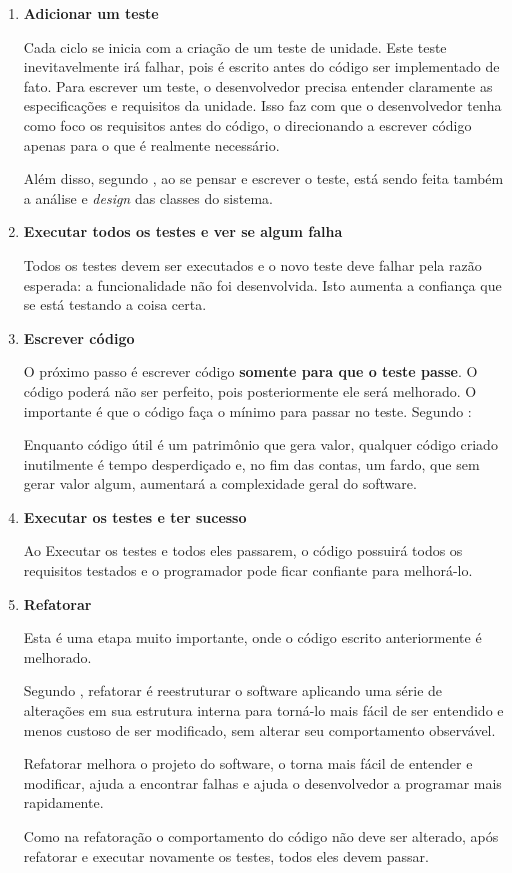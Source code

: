 \begin{enumerate}
\item \textbf{Adicionar um teste}

Cada ciclo se inicia com a criação de um teste de unidade. Este teste inevitavelmente irá falhar, pois é escrito antes do código ser implementado de fato. Para escrever um teste, o desenvolvedor precisa entender claramente as especificações e requisitos da unidade. Isso faz com que o desenvolvedor tenha como foco os requisitos antes do código, o direcionando a escrever código apenas para o que é realmente necessário.

Além disso, segundo , ao se pensar e escrever o teste, está sendo feita também a análise e \textit{design} das classes do sistema.

\item \textbf{Executar todos os testes e ver se algum falha}

Todos os testes devem ser executados e o novo teste deve falhar pela razão esperada: a funcionalidade não foi desenvolvida. Isto aumenta a confiança que se está testando a coisa certa.

\item \textbf{Escrever código}

O próximo passo é escrever código \textbf{somente para que o teste passe}. O código poderá não ser perfeito, pois posteriormente ele será melhorado. O importante é que o código faça o mínimo para passar no teste. Segundo :

\begin{citacao}
Enquanto código útil é um patrimônio que gera valor, qualquer código criado inutilmente é tempo desperdiçado e, no fim das contas, um fardo, que sem gerar valor algum, aumentará a complexidade geral do software.
\end{citacao}

\item \textbf{Executar os testes e ter sucesso}

Ao Executar os testes e todos eles passarem, o código possuirá todos os requisitos testados e o programador pode ficar confiante para melhorá-lo.

\item \textbf{Refatorar}

Esta é uma etapa muito importante, onde o código escrito anteriormente é melhorado.

Segundo , refatorar é reestruturar o software aplicando uma série de alterações em sua estrutura interna para torná-lo mais fácil de ser entendido e menos custoso de ser modificado, sem alterar seu comportamento observável.

Refatorar melhora o projeto do software, o torna mais fácil de entender e modificar, ajuda a encontrar falhas e ajuda o desenvolvedor a programar mais rapidamente.

Como na refatoração o comportamento do código não deve ser alterado, após refatorar e executar novamente os testes, todos eles devem passar.

\end{enumerate}

